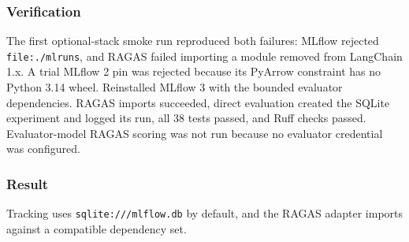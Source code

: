 \subsubsection{Verification}

The first optional-stack smoke run reproduced both failures: MLflow rejected \texttt{file:./mlruns}, and RAGAS failed importing a module removed from LangChain 1.x. A trial MLflow 2 pin was rejected because its PyArrow constraint has no Python 3.14 wheel. Reinstalled MLflow 3 with the bounded evaluator dependencies. RAGAS imports succeeded, direct evaluation created the SQLite experiment and logged its run, all 38 tests passed, and Ruff checks passed. Evaluator-model RAGAS scoring was not run because no evaluator credential was configured.

\subsubsection{Result}

Tracking uses \texttt{sqlite:///mlflow.db} by default, and the RAGAS adapter imports against a compatible dependency set.

